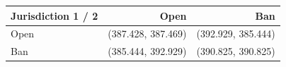 \begin{tabular}{lrr}
\toprule
Jurisdiction 1 / 2 & Open & Ban \\
\midrule
Open & (387.428, 387.469) & (392.929, 385.444) \\
Ban & (385.444, 392.929) & (390.825, 390.825) \\
\bottomrule
\end{tabular}

